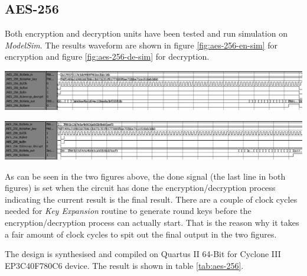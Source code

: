 \documentclass[a4paper, 10pt]{article}
\newenvironment{Figure}
    {\par\medskip\noindent\minipage{\linewidth}}
    {\endminipage\par\medskip}
\begin{document}
\begin{multicols}{2}
        \subsection{AES-256}

	Both encryption and decryption units have been tested and run simulation on \textit{ModelSim}. The results waveform are shown in figure \ref{fig:aes-256-en-sim} for encryption and figure \ref{fig:aes-256-de-sim} for decryption.

	\begin{Figure}
                \centering
                \includegraphics[width=\linewidth]{aes-256-encryption-waveform-edited.png}
                \label{fig:aes-256-en-sim}
            \end{Figure}

	\begin{Figure}
                \centering
                \includegraphics[width=\linewidth]{aes-256-decryption-waveform-edited.png}
                \label{fig:aes-256-de-sim}
            \end{Figure}

	As can be seen in the two figures above, the done signal (the last line in both figures) is set when the circuit has done the encryption/decryption process indicating the current result is the final result. There are a couple of clock cycles needed for \textit{Key Expansion} routine to generate round keys before the encryption/decryption process can actually start. That is the reason why it takes a fair amount of clock cycles to spit out the final output in the two figures.

	The design is synthesised and compiled on Quartus II 64-Bit for Cyclone III EP3C40F780C6 device. The result is shown in table \ref{tab:aes-256}.


\end{multicols}
\end{document}
